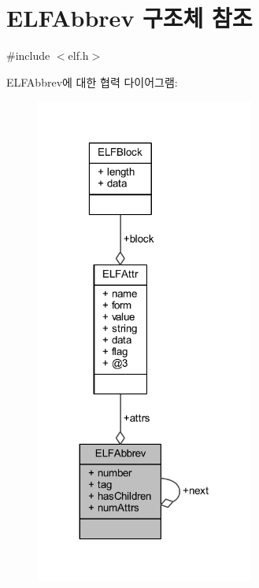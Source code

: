 \hypertarget{struct_e_l_f_abbrev}{}\section{E\+L\+F\+Abbrev 구조체 참조}
\label{struct_e_l_f_abbrev}


{\ttfamily \#include $<$elf.\+h$>$}



E\+L\+F\+Abbrev에 대한 협력 다이어그램\+:\nopagebreak
\begin{figure}[H]
\begin{center}
\leavevmode
\includegraphics[width=203pt]{struct_e_l_f_abbrev__coll__graph}
\end{center}
\end{figure}
